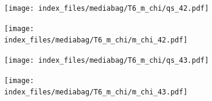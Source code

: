 \documentclass[
  11pt,
  letterpaper,
]{scrreprt}
\begin{document}
\begin{figure}

\begin{minipage}{0.50\linewidth}

\begin{figure}[H]

{\centering \texttt{[image: index\_files/mediabag/T6\_m\_chi/qs\_42.pdf]}

}


\end{figure}%

\end{minipage}%
%
\begin{minipage}{0.50\linewidth}

\begin{figure}[H]

{\centering \texttt{[image: index\_files/mediabag/T6\_m\_chi/m\_chi\_42.pdf]}

}


\end{figure}%

\end{minipage}%

\end{figure}%

\begin{figure}

\begin{minipage}{0.50\linewidth}

\begin{figure}[H]

{\centering \texttt{[image: index\_files/mediabag/T6\_m\_chi/qs\_43.pdf]}

}


\end{figure}%

\end{minipage}%
%
\begin{minipage}{0.50\linewidth}

\begin{figure}[H]

{\centering \texttt{[image: index\_files/mediabag/T6\_m\_chi/m\_chi\_43.pdf]}

}


\end{figure}%

\end{minipage}%

\end{figure}%
\end{document}
